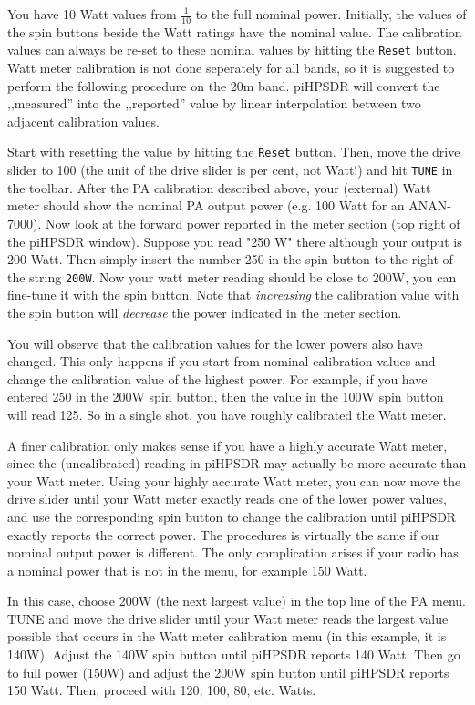 \documentclass[12pt]{book}
\def\rett#1{\texttt{\color{red}#1}}
\begin{document}
You have 10 Watt values from $\frac{1}{10}$ to the full nominal power. Initially,
the values of the spin buttons beside the Watt ratings have the nominal value.
The calibration values can always be re-set to these nominal values by hitting
the \rett{Reset} button. Watt meter calibration is not done seperately for all
bands, so it is suggested to perform the following procedure on the 20m band.
piHPSDR will convert the ,,measured'' into the ,,reported'' value by linear
interpolation between two adjacent calibration values.

Start with resetting the value by hitting the \rett{Reset} button. Then, move the
drive slider to 100 (the unit of the drive slider is per cent, not Watt!) and hit
\texttt{TUNE} in the toolbar.
 After the PA calibration described above, your (external) Watt meter should
show the nominal PA output power (e.g. 100 Watt for an ANAN-7000). Now look at the
forward power reported in the meter section (top right of the piHPSDR window).
Suppose you read "250 W" there although your output is 200 Watt. Then simply
insert the number 250 in the spin button to the right of the string
\rett{200W}. Now your watt meter reading should be close to 200W, you can fine-tune
it with the spin button. Note that \textit{increasing} the calibration value
with the spin button will \textit{decrease} the power indicated in the meter section.

You will observe that the calibration values for the lower powers also have changed.
This only happens if you start from nominal calibration values and change the
calibration value of the highest power. For example, if you have entered 250 in
the 200W spin button, then the value in the 100W spin button will read 125. So in a
single shot, you have roughly calibrated the Watt meter.

A finer calibration only makes sense if you have a highly accurate Watt meter, since
the (uncalibrated) reading in piHPSDR may actually be more accurate than your
Watt meter. Using your highly accurate Watt meter,
you can now move the drive slider until your Watt meter exactly reads one of the
lower power values, and use the corresponding spin button to change the calibration
until piHPSDR exactly reports the correct power. 
The procedures is  virtually the same if our nominal output power is different.
The only complication arises if your radio has a nominal power that is not in the menu,
for example 150 Watt.

In this case, choose 200W (the next largest value)
in the top line of the PA menu. TUNE and move the drive
slider until your Watt meter reads the largest value possible that occurs
in the Watt meter calibration menu (in this example, it is 140W). Adjust the
140W spin button until piHPSDR reports 140 Watt. Then go to full power
(150W) and adjust the 200W spin button until piHPSDR reports 150 Watt.
Then, proceed with 120, 100, 80, etc. Watts.
\end{document}
